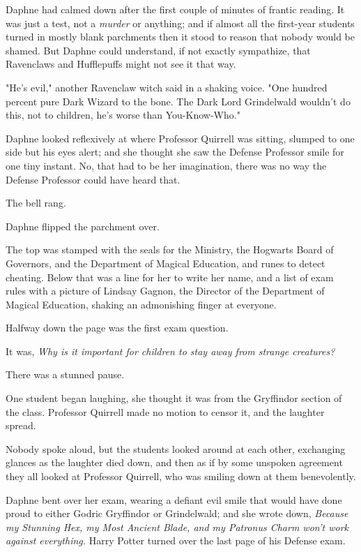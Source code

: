 Daphne had calmed down after the first couple of minutes of frantic reading. It
was just a test, not a \emph{murder} or anything; and if almost all the
first-year students turned in mostly blank parchments then it stood to reason
that nobody would be shamed. But Daphne could understand, if not exactly
sympathize, that Ravenclaws and Hufflepuffs might not see it that way.

"He's evil," another Ravenclaw witch said in a shaking voice. "One hundred
percent pure Dark Wizard to the bone. The Dark Lord Grindelwald wouldn't do
this, not to children, he's worse than You-Know-Who."

Daphne looked reflexively at where Professor Quirrell was sitting, slumped to
one side but his eyes alert; and she thought she saw the Defense Professor
smile for one tiny instant. No, that had to be her imagination, there was no
way the Defense Professor could have heard that.

The bell rang.

Daphne flipped the parchment over.

The top was stamped with the seals for the Ministry, the Hogwarts Board of
Governors, and the Department of Magical Education, and runes to detect
cheating. Below that was a line for her to write her name, and a list of exam
rules with a picture of Lindsay Gagnon, the Director of the Department of
Magical Education, shaking an admonishing finger at everyone.

Halfway down the page was the first exam question.

It was, \emph{Why is it important for children to stay away from strange
creatures?}

There was a stunned pause.

One student began laughing, she thought it was from the Gryffindor section of
the class. Professor Quirrell made no motion to censor it, and the laughter
spread.

Nobody spoke aloud, but the students looked around at each other, exchanging
glances as the laughter died down, and then as if by some unspoken agreement
they all looked at Professor Quirrell, who was smiling down at them
benevolently.

Daphne bent over her exam, wearing a defiant evil smile that would have done
proud to either Godric Gryffindor or Grindelwald; and she wrote down,
\emph{Because my Stunning Hex, my Most Ancient Blade, and my Patronus Charm
won't work against everything.}
\sbreak
Harry Potter turned over the last page of his Defense exam.


